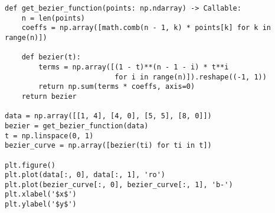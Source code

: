 \begin{lstlisting}
def get_bezier_function(points: np.ndarray) -> Callable:
    n = len(points)
    coeffs = np.array([math.comb(n - 1, k) * points[k] for k in range(n)])

    def bezier(t):
        terms = np.array([(1 - t)**(n - 1 - i) * t**i
                          for i in range(n)]).reshape((-1, 1))
        return np.sum(terms * coeffs, axis=0)
    return bezier

data = np.array([[1, 4], [4, 0], [5, 5], [8, 0]])
bezier = get_bezier_function(data)
t = np.linspace(0, 1)
bezier_curve = np.array([bezier(ti) for ti in t])

plt.figure()
plt.plot(data[:, 0], data[:, 1], 'ro')
plt.plot(bezier_curve[:, 0], bezier_curve[:, 1], 'b-')
plt.xlabel('$x$')
plt.ylabel('$y$')
\end{lstlisting}